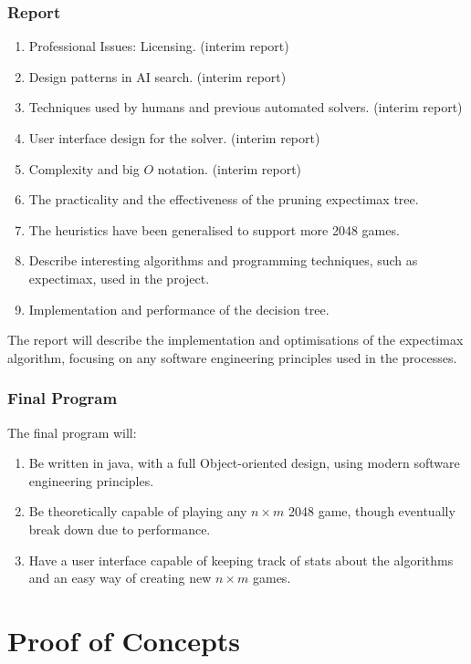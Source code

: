 \documentclass{article}
\begin{document}
\subsubsection{Report}
\begin{enumerate}
    \item Professional Issues: Licensing. (interim report)
    \item Design patterns in AI search. (interim report)
    \item Techniques used by humans and previous automated solvers. (interim report)
    \item User interface design for the solver. (interim report)
    \item Complexity and big $O$ notation. (interim report)
    \item The practicality and the effectiveness of the pruning expectimax tree.
    \item The heuristics have been generalised to support more 2048 games.
    \item Describe interesting algorithms and programming techniques, such as expectimax, used in the project.
    \item Implementation and performance of the decision tree.    
\end{enumerate}
The report will describe the implementation and optimisations of the expectimax algorithm, focusing on any software engineering principles used in the processes. 
\subsubsection{Final Program}
The final program will:
\begin{enumerate}
    \item Be written in java, with a full Object-oriented design, using modern software engineering principles.
    \item Be theoretically capable of playing any $n \times m$ 2048 game, though eventually break down due to performance.
    \item Have a user interface capable of keeping track of stats about the algorithms and an easy way of creating new $n \times m$ games.
\end{enumerate}
\newpage
\section{Proof of Concepts}
\label{sec:proof_of_concepts}
\end{document}
